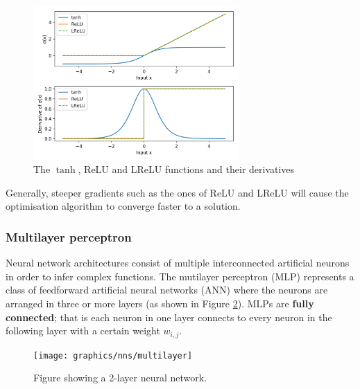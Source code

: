 	\begin{figure}[H]
		\centering
		\includegraphics[width=0.7\textwidth]{graphics/nns/activations}
		
		\caption[Activation functions]{The $\tanh$, ReLU and LReLU functions and their derivatives}
		\label{Figure 2.6}
	\end{figure}

	Generally, steeper gradients such as the ones of ReLU and LReLU will cause the optimisation algorithm to converge faster to a solution.
 	
	
	
	
	\subsubsection{Multilayer perceptron}  \label{Section 2.2.2.2}
	Neural network architectures consist of multiple interconnected artificial neurons in order to infer complex functions. The mutilayer perceptron (MLP) represents a class of feedforward artificial neural networks (ANN) where the neurons are arranged in three or more layers (as shown in Figure \ref{Figure 2.7}).  MLPs are \textbf{fully connected}; that is each neuron in one layer connects to every neuron in the following layer with a certain weight $w_{i, j}$. 
	
	\begin{figure}[H]
		\centering
		\texttt{[image: graphics/nns/multilayer]}
		\caption[Multilayer perceptron]{
			Figure showing a 2-layer neural network.
		}
		\label{Figure 2.7}	
	\end{figure}	
	
